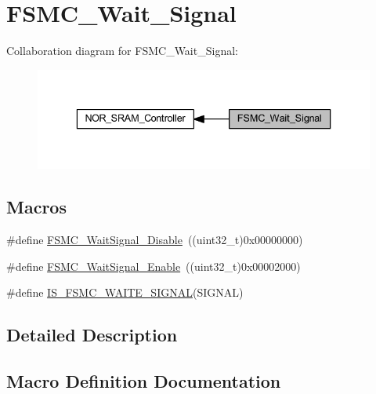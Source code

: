 \hypertarget{group___f_s_m_c___wait___signal}{}\section{F\+S\+M\+C\+\_\+\+Wait\+\_\+\+Signal}
\label{group___f_s_m_c___wait___signal}
Collaboration diagram for F\+S\+M\+C\+\_\+\+Wait\+\_\+\+Signal\+:
\nopagebreak
\begin{figure}[H]
\begin{center}
\leavevmode
\includegraphics[width=336pt]{group___f_s_m_c___wait___signal}
\end{center}
\end{figure}
\subsection*{Macros}
\begin{DoxyCompactItemize}
\item 
\#define \hyperlink{group___f_s_m_c___wait___signal_ga6ea66c8ddee073281c421533bdff7e19}{F\+S\+M\+C\+\_\+\+Wait\+Signal\+\_\+\+Disable}~((uint32\+\_\+t)0x00000000)
\item 
\#define \hyperlink{group___f_s_m_c___wait___signal_gaf809e339f1cdc9d0a815fd98712e9ee3}{F\+S\+M\+C\+\_\+\+Wait\+Signal\+\_\+\+Enable}~((uint32\+\_\+t)0x00002000)
\item 
\#define \hyperlink{group___f_s_m_c___wait___signal_gae617db4f15c82850d4f5c927f9a7db3e}{I\+S\+\_\+\+F\+S\+M\+C\+\_\+\+W\+A\+I\+T\+E\+\_\+\+S\+I\+G\+N\+AL}(S\+I\+G\+N\+AL)
\end{DoxyCompactItemize}


\subsection{Detailed Description}


\subsection{Macro Definition Documentation}
\mbox{\label{group___f_s_m_c___wait___signal_ga6ea66c8ddee073281c421533bdff7e19}} 
